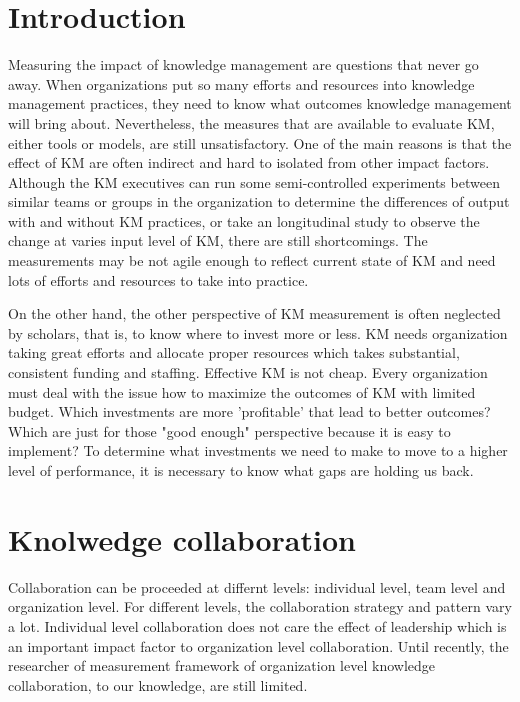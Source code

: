 \documentclass{elsarticle}
\begin{document}
\section{ Introduction}
Measuring  the impact of knowledge management are questions that never
go away. When organizations put so many efforts and resources into
knowledge management practices, they need to know what outcomes
knowledge management will bring about.  Nevertheless,  the measures that are
available to evaluate KM, either tools or models, are still
unsatisfactory.  One of the main reasons is that the effect of KM are
often indirect and hard to isolated from other impact
factors. Although the KM executives can run some semi-controlled
experiments between similar teams or groups in the organization to
determine the differences of  output with and without KM practices, or
take an longitudinal study  to observe the change at varies input
level of KM, there are still shortcomings. The measurements may be not
 agile enough to reflect current state of KM and need lots of efforts
 and resources to take into practice.   

 On the other hand, the other
 perspective of KM measurement is often neglected by scholars, that
 is, to know where to invest more or less.  KM needs organization
 taking great efforts and allocate proper resources which  takes substantial, consistent funding and staffing. Effective KM is
 not cheap. Every organization must deal with the issue how to
 maximize the outcomes of KM with limited budget.  Which 
 investments are more 'profitable' that lead to better outcomes?
 Which are just for those "good enough" perspective  because  it is
 easy to implement? To determine what investments we need to make to
 move to a higher level of performance, it is necessary to know what
 gaps are holding us back. 

\section{Knolwedge collaboration}
\label{sec:knolw-coll}

Collaboration can be proceeded at differnt levels: individual level,
team level and organization level. For different levels, the
collaboration strategy
and  pattern vary a lot. Individual level collaboration does not care
the effect of leadership which is an important impact factor to
organization level collaboration. Until recently, the researcher of 
measurement framework of organization level knowledge collaboration,
to our knowledge, are still limited.     
\end{document}
